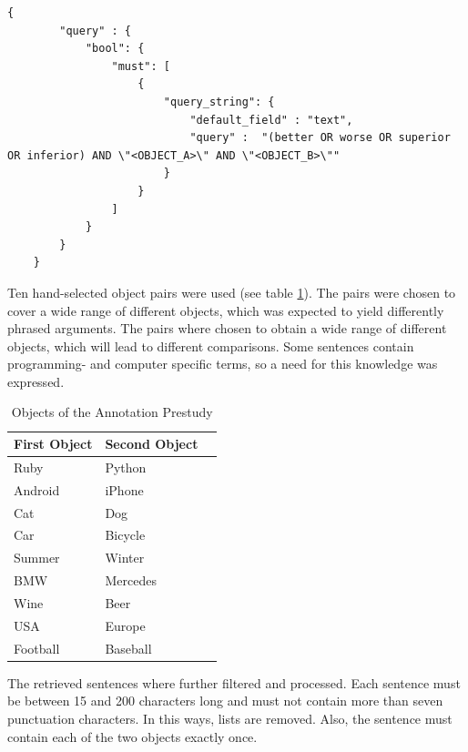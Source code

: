 \begin{lstlisting}[label=lst:es-query-a,breaklines=true,postbreak=\mbox{\textcolor{red}{$\hookrightarrow$}\space}]
  {
        "query" : {
            "bool": {
                "must": [
                    {
                        "query_string": {
                            "default_field" : "text",
                            "query" :  "(better OR worse OR superior OR inferior) AND \"<OBJECT_A>\" AND \"<OBJECT_B>\""
                        }
                    }
                ]
            }
        }
    }
\end{lstlisting}



Ten hand-selected object pairs were used (see table \ref{tbl:prestudy-objects}). The pairs were chosen to cover a wide range of different objects, which was expected to yield differently phrased arguments. The pairs where chosen to obtain a wide range of different objects, which will lead to different comparisons. Some sentences contain programming- and computer specific terms, so a need for this knowledge was expressed.
\begin{table}[h]
\centering
\caption{Objects of the Annotation Prestudy}
\label{tbl:prestudy-objects}
\begin{tabular}{@{}lll@{}}
\toprule
First Object & Second Object                                      \\ \midrule
Ruby         & Python                                     \\
Android      & iPhone          \\
Cat          & Dog                                            \\ 
Car & Bicycle  \\
Summer & Winter  \\
BMW & Mercedes  \\
Wine & Beer  \\
USA & Europe  \\
Football             &          Baseball       \\       \midrule                                  
\end{tabular}
\end{table}

The retrieved sentences where further filtered and processed. Each sentence must be between 15 and 200 characters long and must not contain more than seven punctuation characters. In this ways, lists are removed. Also, the sentence must contain each of the two objects exactly once.



